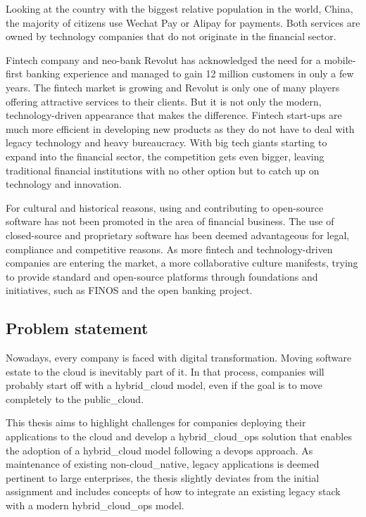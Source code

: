\documentclass[../main.tex]{subfiles}
\begin{document}
    Looking at the country with the biggest relative population in the world, China, the majority of citizens use Wechat Pay or Alipay for payments.
    Both services are owned by technology companies that do not originate in the financial sector.\cite{payment_china}

    Fintech company and neo-bank Revolut has acknowledged the need for a mobile-first banking experience and managed to gain 12 million customers in only a few years.
    The fintech market is growing and Revolut is only one of many players offering attractive services to their clients.
    But it is not only the modern, technology-driven appearance that makes the difference.
    Fintech start-ups are much more efficient in developing new products as they do not have to deal with legacy technology and heavy bureaucracy.
    With big tech giants starting to expand into the financial sector, the competition gets even bigger, leaving traditional financial institutions with no other option but to catch up on technology and innovation.\cite{revolut,fintech_pressure,bigtech_fin_pressure}

    For cultural and historical reasons, using and contributing to open-source software has not been promoted in the area of financial business.
    The use of closed-source and proprietary software has been deemed advantageous for legal, compliance and competitive reasons.
    As more fintech and technology-driven companies are entering the market, a more collaborative culture manifests, trying to provide standard and open-source platforms through foundations and initiatives, such as FINOS and the open banking project.\cite{fin_oss_myths,openbanking}

    \subsection{Problem statement}
    \label{subsec:intro-statement}

    Nowadays, every company is faced with digital transformation.
    Moving software estate to the \gls{cloud} is inevitably part of it.
    In that process, companies will probably start off with a \gls{hybrid_cloud} model, even if the goal is to move completely to the \gls{public_cloud}.

    This thesis aims to highlight challenges for companies deploying their applications to the \gls{cloud} and develop a \gls{hybrid_cloud_ops} solution that enables the adoption of a \gls{hybrid_cloud} model following a \gls{devops} approach.
    As maintenance of existing non-\gls{cloud_native}, legacy applications is deemed pertinent to large enterprises, the thesis slightly deviates from the initial assignment and includes concepts of how to integrate an existing legacy stack with a modern \gls{hybrid_cloud_ops} model.
\end{document}
